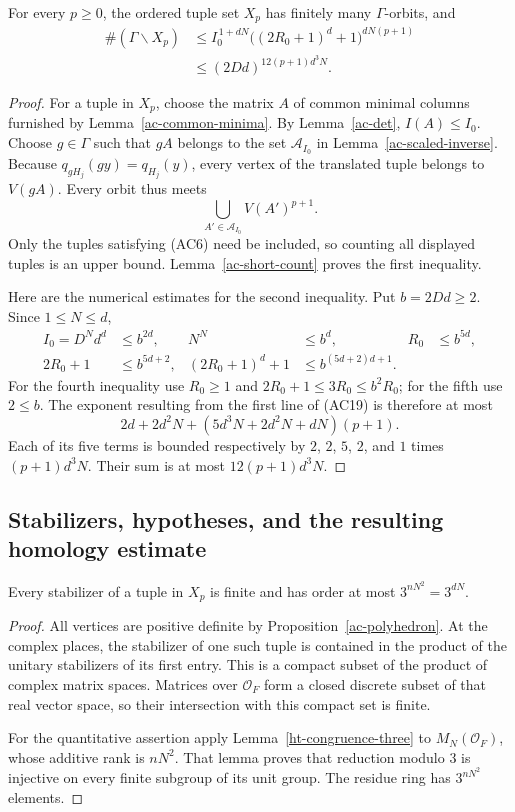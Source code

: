 \begin{theorem}\label{ac-orbit}
For every $p\ge0$, the ordered tuple set $X_p$ has finitely
many $\Gamma$-orbits, and
\[
 \begin{split}
 \#(\Gamma\backslash X_p)
   &\le I_0^{\,1+dN}
       \bigl((2R_0+1)^d+1\bigr)^{dN(p+1)}\\
   &\le (2Dd)^{12(p+1)d^3N}.
 \end{split}
 \tag{AC19}
\]
\end{theorem}
\begin{proof}
For a tuple in $X_p$, choose the matrix $A$ of common
minimal columns furnished by Lemma~\ref{ac-common-minima}.
By Lemma~\ref{ac-det}, $I(A)\le I_0$.
Choose $g\in\Gamma$ such that $gA$ belongs to the set
$\mathscr A_{I_0}$ in Lemma~\ref{ac-scaled-inverse}.
Because $q_{gH_j}(gy)=q_{H_j}(y)$, every vertex of the
translated tuple belongs to $V(gA)$.
Every orbit thus meets
\[
              \bigcup_{A'\in\mathscr A_{I_0}}V(A')^{p+1}.
\]
Only the tuples satisfying (AC6) need be included, so
counting all displayed tuples is an upper bound.
Lemma~\ref{ac-short-count} proves the first inequality.

Here are the numerical estimates for the second inequality.
Put $b=2Dd\ge2$.  Since $1\le N\le d$,
\[
 \begin{aligned}
 I_0=D^N d^d&\le b^{2d},&
 N^N&\le b^d,&
 R_0&\le b^{5d},\\
 2R_0+1&\le b^{5d+2},&
 (2R_0+1)^d+1&\le b^{(5d+2)d+1}.
 \end{aligned}
\]
For the fourth inequality use $R_0\ge1$ and
$2R_0+1\le3R_0\le b^2R_0$; for the fifth use $2\le b$.
The exponent resulting from the first line of (AC19)
is therefore at most
\[
       2d+2d^2N+(5d^3N+2d^2N+dN)(p+1).
\]
Each of its five terms is bounded respectively by
$2$, $2$, $5$, $2$, and $1$ times $(p+1)d^3N$.
Their sum is at most $12(p+1)d^3N$.
\end{proof}

\subsection{Stabilizers, hypotheses, and the resulting homology estimate}

\begin{proposition}\label{ac-stabilizer}
Every stabilizer of a tuple in $X_p$ is finite and has
order at most $3^{nN^2}=3^{dN}$.
\end{proposition}
\begin{proof}
All vertices are positive definite by
Proposition~\ref{ac-polyhedron}.  At the complex places,
the stabilizer of one such tuple is contained in the
product of the unitary stabilizers of its first entry.
This is a compact subset of the product of complex
matrix spaces.  Matrices over $\mathcal O_F$ form a
closed discrete subset of that real vector space,
so their intersection with this compact set is finite.

For the quantitative assertion apply
Lemma~\ref{ht-congruence-three} to
$M_N(\mathcal O_F)$, whose additive rank is $nN^2$.
That lemma proves that reduction modulo $3$ is injective
on every finite subgroup of its unit group.  The residue
ring has $3^{nN^2}$ elements.
\end{proof}

